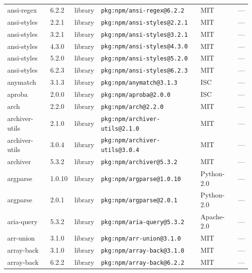 \documentclass[11pt,a4paper]{article}
\begin{document}
\begin{longtable}{|p{4cm}|p{2cm}|p{1.6cm}|p{5cm}|p{1.5cm}|p{3.5cm}|}
\raggedright ansi-regex & 6.2.2 & library & \small\texttt{pkg:npm/ansi-regex@6.2.2} & MIT & \small — \\
\raggedright ansi-styles & 2.2.1 & library & \small\texttt{pkg:npm/ansi-styles@2.2.1} & MIT & \small — \\
\raggedright ansi-styles & 3.2.1 & library & \small\texttt{pkg:npm/ansi-styles@3.2.1} & MIT & \small — \\
\raggedright ansi-styles & 4.3.0 & library & \small\texttt{pkg:npm/ansi-styles@4.3.0} & MIT & \small — \\
\raggedright ansi-styles & 5.2.0 & library & \small\texttt{pkg:npm/ansi-styles@5.2.0} & MIT & \small — \\
\raggedright ansi-styles & 6.2.3 & library & \small\texttt{pkg:npm/ansi-styles@6.2.3} & MIT & \small — \\
\raggedright anymatch & 3.1.3 & library & \small\texttt{pkg:npm/anymatch@3.1.3} & ISC & \small — \\
\raggedright aproba & 2.0.0 & library & \small\texttt{pkg:npm/aproba@2.0.0} & ISC & \small — \\
\raggedright arch & 2.2.0 & library & \small\texttt{pkg:npm/arch@2.2.0} & MIT & \small — \\
\raggedright archiver-utils & 2.1.0 & library & \small\texttt{pkg:npm/archiver-utils@2.1.0} & MIT & \small — \\
\raggedright archiver-utils & 3.0.4 & library & \small\texttt{pkg:npm/archiver-utils@3.0.4} & MIT & \small — \\
\raggedright archiver & 5.3.2 & library & \small\texttt{pkg:npm/archiver@5.3.2} & MIT & \small — \\
\raggedright argparse & 1.0.10 & library & \small\texttt{pkg:npm/argparse@1.0.10} & Python-2.0 & \small — \\
\raggedright argparse & 2.0.1 & library & \small\texttt{pkg:npm/argparse@2.0.1} & Python-2.0 & \small — \\
\raggedright aria-query & 5.3.2 & library & \small\texttt{pkg:npm/aria-query@5.3.2} & Apache-2.0 & \small — \\
\raggedright arr-union & 3.1.0 & library & \small\texttt{pkg:npm/arr-union@3.1.0} & MIT & \small — \\
\raggedright array-back & 3.1.0 & library & \small\texttt{pkg:npm/array-back@3.1.0} & MIT & \small — \\
\raggedright array-back & 6.2.2 & library & \small\texttt{pkg:npm/array-back@6.2.2} & MIT & \small — \\

\end{longtable}
\end{document}
